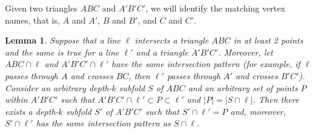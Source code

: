\documentclass[reqno,12pt]{amsart}
\newtheorem{lemma}[theorem]{Lemma}
\begin{document}
Given two triangles $ABC$ and $A'B'C'$, we will identify the matching vertex names,
that is, $A$ and $A'$, $B$ and $B'$, and $C$ and $C'$.

\begin{lemma}\label{lem:foldfree2}
Suppose that a line $\ell$ intersects a triangle $ABC$ in at least 2 points
and the same is true for a line $\ell'$ and a triangle $A'B'C'$.
Moreover, let $ABC\cap\ell$ and $A'B'C'\cap\ell'$ have the same intersection
pattern (for example, if $\ell$ passes through $A$ and crosses $BC$, then
$\ell'$ passes through $A'$ and crosses $B'C'$).
Consider an arbitrary depth-$k$ subfold $S$ of $ABC$ and an arbitrary
set of points $P$ within $A'B'C'$ such that
$A'B'C'\cap\ell'\subset P\subset\ell'$ and $|P|=|S\cap\ell|$.
Then there exists a depth-$k$ subfold $S'$ of $A'B'C'$ such that
$S'\cap\ell'=P$ and, moreover, $S'\cap\ell'$ has the same intersection pattern
as $S\cap\ell$.
\end{lemma}
\end{document}
